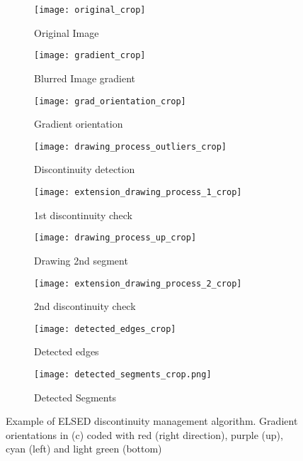 \documentclass[preprint,12pt]{elsarticle}
\begin{document}
\begin{figure*}
    \centering
    \footnotesize
    \begin{subfigure}{.33\textwidth}
     \centering
     \texttt{[image: original\_crop]}
     \caption{Original Image}
     \label{fig:discontinuity-management-original}
    \end{subfigure}\vspace{0.5ex}\begin{subfigure}{.33\textwidth}
     \centering
     \texttt{[image: gradient\_crop]}
     \caption{Blurred Image gradient}
     \label{fig:discontinuity-management-gradient}
    \end{subfigure}\begin{subfigure}{.33\textwidth}
     \centering
     \texttt{[image: grad\_orientation\_crop]}
     \caption{Gradient orientation}     
     \label{fig:discontinuity-management-gradient-orientation}
    \end{subfigure}
\begin{subfigure}{.33\textwidth}
     \centering
     \texttt{[image: drawing\_process\_outliers\_crop]}
     \caption{Discontinuity detection}
     \label{fig:discontinuity-management-outliers}
    \end{subfigure}\begin{subfigure}{.33\textwidth}
     \centering
     \texttt{[image: extension\_drawing\_process\_1\_crop]}
     \caption{1st discontinuity check}
     \label{fig:discontinuity-management-extension1}
    \end{subfigure}\begin{subfigure}{.33\textwidth}
     \centering
     \texttt{[image: drawing\_process\_up\_crop]}
     \caption{Drawing 2nd segment}
     \label{fig:discontinuity-management-going-up}
    \end{subfigure}
\begin{subfigure}{.33\textwidth}
     \centering
     \texttt{[image: extension\_drawing\_process\_2\_crop]}
     \caption{2nd discontinuity check}
     \label{fig:discontinuity-management-extension2}
    \end{subfigure}\begin{subfigure}{.33\textwidth}
     \centering
     \texttt{[image: detected\_edges\_crop]}
     \caption{Detected edges}
     \label{fig:discontinuity-management-edges}
    \end{subfigure}\begin{subfigure}{.33\textwidth}
     \centering
     \texttt{[image: detected\_segments\_crop.png]}
     \caption{Detected Segments}
     \label{fig:discontinuity-management-segments}
    \end{subfigure}
\caption{Example of ELSED discontinuity management algorithm. Gradient orientations in (c) coded with red (right direction), purple (up), cyan (left) and light green (bottom)}
    \label{fig:discontinuity-management}
\end{figure*}
\end{document}
